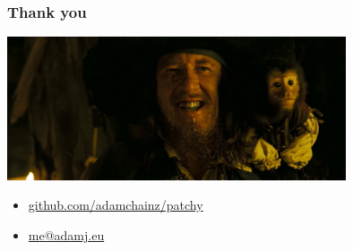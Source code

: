 \documentclass{beamer}
\begin{document}
\begin{frame}[fragile]\frametitle{Thank you}

    \begin{center}
        \includegraphics[width=10cm]{barbossa}
    \end{center}

    \begin{itemize}
        \item \url{github.com/adamchainz/patchy}
        \item \url{me@adamj.eu}
    \end{itemize}

\end{frame}
\end{document}
